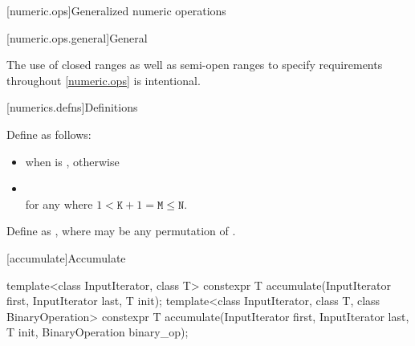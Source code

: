 [numeric.ops]{Generalized numeric operations}

[numeric.ops.general]{General}

\pnum
\begin{note}
The use of closed ranges as well as semi-open ranges
to specify requirements throughout \ref{numeric.ops} is intentional.
\end{note}

[numerics.defns]{Definitions}

%
\pnum
Define 
as follows:
\begin{itemize}
\item
{} when  is , otherwise

\item
{} \\
for any  where $1 < \mathtt{K}+1 = \mathtt{M} \leq \mathtt{N}$.
\end{itemize}

%
\pnum
Define  as
,
\linebreak{}where
 may be any permutation of .

[accumulate]{Accumulate}

%
\begin{itemdecl}
template<class InputIterator, class T>
  constexpr T accumulate(InputIterator first, InputIterator last, T init);
template<class InputIterator, class T, class BinaryOperation>
  constexpr T accumulate(InputIterator first, InputIterator last, T init,
                         BinaryOperation binary_op);
\end{itemdecl}

